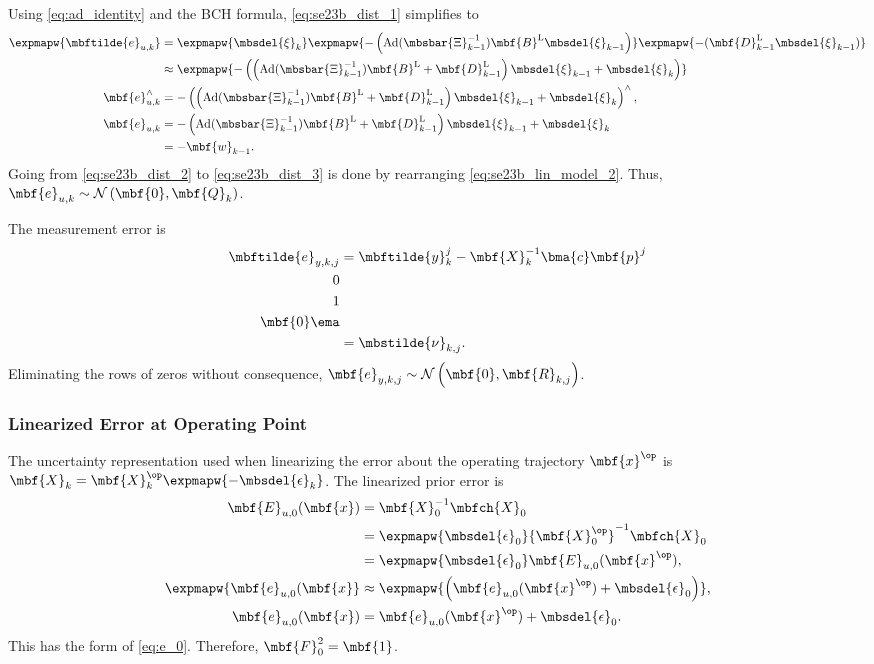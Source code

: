 Using \eqref{eq:ad_identity} and the BCH formula, \eqref{eq:se23b_dist_1} simplifies to 
\begin{align}
	\expmapw{\mbftilde{e}_{u,k}} &= \expmapw{\mbsdel{\xi}_k}\expmapw{-\left(\textrm{Ad}(\mbsbar{\Xi}_{k-1}^{-1})\mbf{B}^\textrm{L}\mbsdel{\xi}_{k-1}\right)}\expmapw{-(\mbf{D}_{k-1}^\textrm{L}\mbsdel{\xi}_{k-1})} \notag \\
	 &\approx \expmapw{-\left(\left(\textrm{Ad}(\mbsbar{\Xi}_{k-1}^{-1})\mbf{B}^\textrm{L} + \mbf{D}_{k-1}^\textrm{L}\right)\mbsdel{\xi}_{k-1} + \mbsdel{\xi}_k\right)} \notag\\
	 \mbf{e}_{u,k}^\wedge &= -\left(\left(\textrm{Ad}(\mbsbar{\Xi}_{k-1}^{-1})\mbf{B}^\textrm{L} + \mbf{D}_{k-1}^\textrm{L}\right)\mbsdel{\xi}_{k-1} + \mbsdel{\xi}_k\right)^\wedge,  \notag \\
	 \mbf{e}_{u,k} &= -\left(\textrm{Ad}(\mbsbar{\Xi}_{k-1}^{-1})\mbf{B}^\textrm{L} + \mbf{D}_{k-1}^\textrm{L}\right)\mbsdel{\xi}_{k-1} + \mbsdel{\xi}_k \label{eq:se23b_dist_2} \\
	 &= -\mbf{w}_{k-1} \label{eq:se23b_dist_3}. 
\end{align}
Going from \eqref{eq:se23b_dist_2} to \eqref{eq:se23b_dist_3} is done by rearranging \eqref{eq:se23b_lin_model_2}. Thus, $\mbf{e}_{u,k} \sim \mathcal{N}\left(\mbf{0},\mbf{Q}_k\right)$.


The measurement error is
\begin{align*}
	\mbftilde{e}_{y,k,j} &= \mbftilde{y}_k^j - \mbf{X}_k^{-1} \bma{c} \mbf{p}^j \\ 0 \\ 1 \\ \mbf{0} \ema \\
	&= \mbstilde{\nu}_{k,j}.
\end{align*}
Eliminating the rows of zeros without consequence, $\mbf{e}_{y,k,j} \sim \mathcal{N}\left(\mbf{0},\mbf{R}_{k,j}\right)$.

\subsubsection{Linearized Error at Operating Point}
\label{sssec:se23b_left_lin}

The uncertainty representation used when linearizing the error about the operating trajectory $\mbf{x}^\op$ is $\mbf{X}_k = \mbf{X}_k^\op\expmapw{-\mbsdel{\epsilon}_k}$. The linearized prior error is 
\begin{align*}
	\mbf{E}_{u,0}(\mbf{x}) &= \mbf{X}_0^{-1}\mbfch{X}_0 \\
	&= \expmapw{\mbsdel{\epsilon}_0}{\mbf{X}_0^\op}^{-1}\mbfch{X}_0 \\
	&= \expmapw{\mbsdel{\epsilon}_0}\mbf{E}_{u,0}(\mbf{x}^\op), \\
	\expmapw{\mbf{e}_{u,0}(\mbf{x}} &\approx\expmapw {\left(\mbf{e}_{u,0}(\mbf{x}^\op) + \mbsdel{\epsilon}_0\right)}, \\
	\mbf{e}_{u,0}(\mbf{x}) &= \mbf{e}_{u,0}(\mbf{x}^\op)+\mbsdel{\epsilon}_0.
\end{align*}
This has the form of \eqref{eq:e_0}. Therefore, $\mbf{F}_0^2 = \mbf{1}$.

